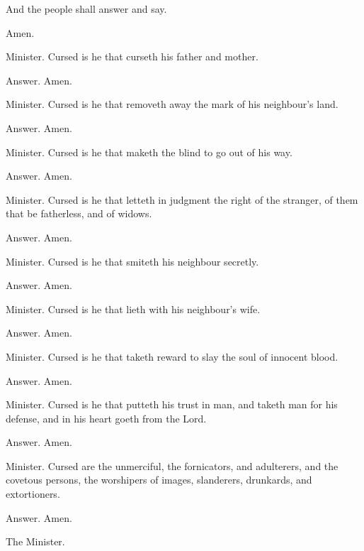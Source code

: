 And the people shall answer
and say.

Amen.

Minister. Cursed is he
that curseth his father and mother.

Answer. Amen.

Minister. Cursed is he that removeth away
the mark of his neighbour's land.

Answer. Amen.

Minister. Cursed is he that maketh the blind to
go out of his way.

Answer. Amen.

Minister. Cursed is he that letteth in
judgment the right of the stranger, of them that be fatherless, and of widows.

Answer. Amen.

Minister. Cursed is he that smiteth his
neighbour secretly.

Answer. Amen.

Minister. Cursed is he that lieth with his
neighbour's wife.

Answer. Amen.

Minister. Cursed is he that taketh reward to
slay the soul of innocent blood.

Answer. Amen.

Minister. Cursed is he that putteth his
trust in man, and taketh man for his defense, and in his heart goeth from the Lord.

Answer. Amen.

Minister. Cursed are the unmerciful, the
fornicators, and adulterers, and the covetous persons, the worshipers of images,
slanderers, drunkards, and extortioners.

Answer. Amen.

The Minister.

